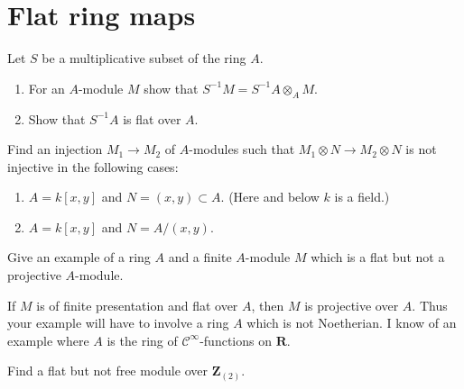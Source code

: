 \section{Flat ring maps}
\label{section-flat}

\begin{exercise}
\label{exercise-localization-flat}
Let $S$ be a multiplicative subset of the ring $A$.
\begin{enumerate}
\item For an $A$-module $M$ show that $S^{-1}M = S^{-1}A \otimes_A M$.
\item Show that $S^{-1}A$ is flat over $A$.
\end{enumerate}
\end{exercise}

\begin{exercise}
\label{exercise-examples-not-flat}
Find an injection $M_1 \to M_2$ of $A$-modules such that
$M_1\otimes N \to M_2 \otimes N$ is not injective in the following
cases:
\begin{enumerate}
\item $A = k[x, y]$ and $N = (x, y) \subset A$. (Here and below $k$ is a field.)
\item $A = k[x, y]$ and $N = A/(x, y)$.
\end{enumerate}
\end{exercise}

\begin{exercise}
\label{exercise-flat-not-projective}
Give an example of a ring $A$ and a finite $A$-module $M$
which is a flat but not a projective $A$-module.
\end{exercise}

\begin{remark}
\label{remark-flat-not-projective}
If $M$ is of finite presentation and flat over $A$,
then $M$ is projective over $A$. Thus your example will have to
involve a ring $A$ which is not Noetherian. I know of an example
where $A$ is the ring of ${\mathcal C}^\infty$-functions on ${\mathbf R}$.
\end{remark}

\begin{exercise}
\label{exercise-flat-not-free-dvr}
Find a flat but not free module over ${\mathbf Z}_{(2)}$.
\end{exercise}

